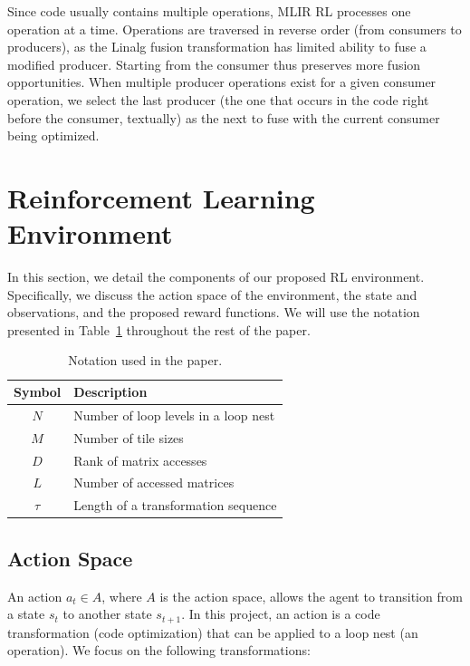 \documentclass[10pt,twocolumn]{article}
\begin{document}
Since code usually contains multiple operations, MLIR RL processes one operation at a time. Operations are traversed in reverse order (from consumers to producers), as the Linalg fusion transformation has limited ability to fuse a modified producer. Starting from the consumer thus preserves more fusion opportunities. When multiple producer operations exist for a given consumer operation, we select the last producer (the one that occurs in the code right before the consumer, textually) as the next to fuse with the current consumer being optimized.

\section{Reinforcement Learning Environment}

In this section, we detail the components of our proposed RL environment. Specifically, we discuss the action space of the environment, the state and observations, and the proposed reward functions. We will use the notation presented in Table~\ref{tab:notation} throughout the rest of the paper.

\begin{table}[t]
\centering
\caption{Notation used in the paper.}
\label{tab:notation}
\begin{tabular}{cl}
\toprule
Symbol & Description \\
\midrule
$N$ & Number of loop levels in a loop nest \\
$M$ & Number of tile sizes \\
$D$ & Rank of matrix accesses \\
$L$ & Number of accessed matrices \\
$\tau$ & Length of a transformation sequence \\
\bottomrule
\end{tabular}
\end{table}

\subsection{Action Space}
\label{sec:actionspace}

An action $a_t \in A$, where $A$ is the action space, allows the agent to transition from a state $s_t$ to another state $s_{t+1}$. In this project, an action is a code transformation (code optimization) that can be applied to a loop nest (an operation). We focus on the following transformations:
\end{document}
